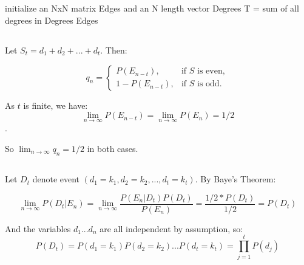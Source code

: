 \documentclass{article}
\begin{document}
\subsection{} 

\begin{algorithm}[H]
 initialize an NxN matrix Edges and an N length vector Degrees\;
T = sum of all degrees in Degrees\;
\Return Edges

\end{algorithm}

\subsection{}
Let $S_t = d_1 + d_2 + ... + d_t$. Then:

$$q_n  = \begin{cases}
  P(E_{n-t}), & \text{if } S \text{ is even}, \\
  1 - P(E_{n-t}), & \text{if }  S \text{ is odd}.
\end{cases}$$

As $t$ is finite, we have:
$$\lim_{n\to\infty} P(E_{n-t}) = \lim_{n\to\infty} P(E_{n})  = 1/2$$. 

So $\lim_{n\to\infty} q_n = 1/2$ in both cases.

\subsection{}
Let $D_t$ denote event $(d_1 = k_1, d_2 = k_2,..., d_t = k_t)$. By Baye's Theorem:

$$ \lim_{n\to\infty} P(D_t | E_n) = \lim_{n\to\infty} \frac{P(E_n | D_t)P(D_t)}{P(E_n)} = \frac{1/2* P(D_t)}{1/2} = P(D_t) $$

And the variables $d_1...d_n$ are all independent by assumption, so:
$$P(D_t) = P(d_1 = k_1) P(d_2 = k_2) ... P(d_t = k_t) = \prod_{j=1}^{t} P(d_j)$$ 
\end{document}
